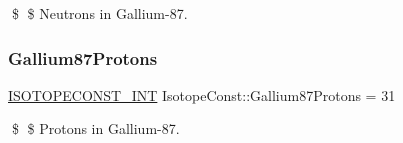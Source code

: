 \$ \$ Neutrons in Gallium-\/87. \mbox{\label{group___isotope_const-_gallium-_ga87_gaaf0847382e3f75fee5b80b2f173c9676}} 
\subsubsection{\texorpdfstring{Gallium87\+Protons}{Gallium87Protons}}
{\footnotesize\ttfamily \mbox{\hyperlink{group___isotope_const-_macros_ga5f18360b3e99483a35c32d789e62621c}{I\+S\+O\+T\+O\+P\+E\+C\+O\+N\+S\+T\+\_\+\+I\+NT}} Isotope\+Const\+::\+Gallium87\+Protons = 31}

\$ \$ Protons in Gallium-\/87. 